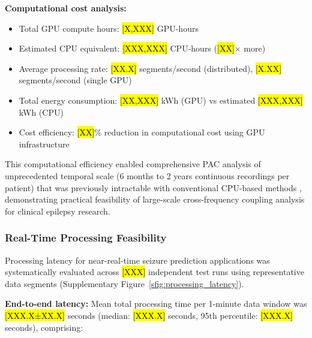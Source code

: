 \textbf{Computational cost analysis:}
\begin{itemize}
\item Total GPU compute hours: \hl{[X,XXX]} GPU-hours
\item Estimated CPU equivalent: \hl{[XXX,XXX]} CPU-hours (\hl{[XX]}× more)
\item Average processing rate: \hl{[XX.X]} segments/second (distributed), \hl{[X.XX]} segments/second (single GPU)
\item Total energy consumption: \hl{[XX,XXX]} kWh (GPU) vs estimated \hl{[XXX,XXX]} kWh (CPU)
\item Cost efficiency: \hl{[XX]}\% reduction in computational cost using GPU infrastructure
\end{itemize}

This computational efficiency enabled comprehensive PAC analysis of unprecedented temporal scale (6 months to 2 years continuous recordings per patient) that was previously intractable with conventional CPU-based methods \cite{MartnezCancino2020ComputingPABK}, demonstrating practical feasibility of large-scale cross-frequency coupling analysis for clinical epilepsy research.

\subsubsection{Real-Time Processing Feasibility}
Processing latency for near-real-time seizure prediction applications was systematically evaluated across \hl{[XXX]} independent test runs using representative data segments (Supplementary Figure~\ref{sfig:processing_latency}).

\textbf{End-to-end latency:} Mean total processing time per 1-minute data window was \hl{[XXX.X±XX.X]} seconds (median: \hl{[XXX.X]} seconds, 95th percentile: \hl{[XXX.X]} seconds), comprising:

